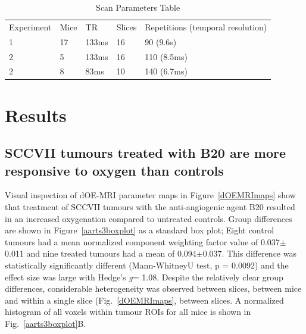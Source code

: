 \begin{table}[]
\centering
\begin{tabular}{lllll}
Experiment & Mice & TR & Slices & Repetitions (temporal resolution) \\
 1 & 17 & 133ms & 16 & 90 (9.6s)  \\
 2 & 5 & 133ms & 16 &  110 (8.5ms)  \\
 2 & 8 & 83ms & 10 & 140 (6.7ms) \\
\end{tabular}
\caption{Scan Parameters Table}
\label{scanparams}
\end{table}

\section{Results} 

\subsection{SCCVII tumours treated with B20 are more responsive to oxygen than controls}

Visual inspection of dOE-MRI parameter maps in Figure~\ref{dOEMRImaps} show that treatment of SCCVII tumours with the anti-angiogenic agent B20 resulted in an increased oxygenation compared to untreated controls.
Group differences are shown in Figure~\ref{aarts3boxplot} as a standard box plot; Eight control tumours had a mean normalized component weighting factor value of 0.037$\pm$0.011 and nine treated tumours had a mean of 0.094$\pm$0.037.
This difference was statistically significantly different (Mann-WhitneyU test, p = 0.0092) and the effect size was large with Hedge's \emph{g}= 1.08.
Despite the relatively clear group differences, considerable heterogeneity was observed between slices, between mice and within a single slice (Fig.~\ref{dOEMRImaps}, between slices.
A normalized~ histogram of all voxels within tumour ROIs for all mice is shown in Fig.~\ref{aarts3boxplot}B.

